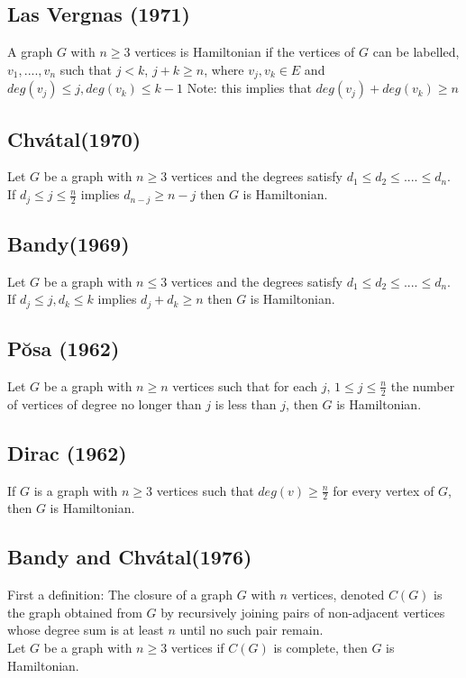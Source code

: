   \subsection{Las Vergnas (1971)}
  A graph $G$ with $n \geq 3$ vertices is Hamiltonian if the vertices of $G$ can be labelled, $v_{1}, .... ,v_{n}$ such that $j < k$, $j + k \geq n$, where $v_{j}, v_{k} \in E$ and $deg(v_{j}) \leq j, deg(v_{k}) \leq k - 1$ Note: this implies that $deg(v_{j}) + deg(v_{k}) \geq n$
    \subsection{Chv\'{a}tal(1970)}
  Let $G$ be a graph with $n \geq 3$ vertices and the degrees satisfy $d_{1} \leq d_{2} \leq .... \leq d_{n}$. If $d_{j} \leq j \leq \frac{n}{2}$ implies $d_{n-j} \geq n - j$ then $G$ is Hamiltonian.
    
    \subsection{Bandy(1969)}
  Let $G$ be a graph with $n \leq 3$ vertices and the degrees satisfy $d_{1} \leq d_{2} \leq .... \leq d_{n}$. If $d_{j} \leq j, d_{k} \leq k$ implies $d_{j} + d_{k} \geq n$ then $G$ is Hamiltonian.
    
    \subsection{P\u{o}sa (1962)}
   Let $G$ be a graph with $n \geq n$ vertices such that for each $j$, $1 \leq j \leq \frac{n}{2}$ the number of vertices of degree no longer than $j$ is less than $j$, then $G$ is Hamiltonian.
    
    \subsection{Dirac (1962)}
   If $G$ is a graph with $n \geq 3$ vertices such that $deg(v) \geq \frac{n}{2}$ for every vertex of $G$, then $G$ is Hamiltonian.
    
    \subsection{Bandy and Chv\'{a}tal(1976)}
  First a definition: The closure of a graph $G$ with $n$ vertices, denoted $C(G)$ is the graph obtained from $G$ by recursively joining pairs of non-adjacent vertices whose degree sum is at least $n$ until no such pair remain.\\
    Let $G$ be a graph with $n \geq 3$ vertices if $C(G)$ is complete, then $G$ is Hamiltonian.



